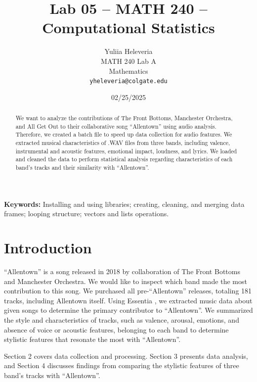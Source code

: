 \documentclass{article}\usepackage[]{graphicx}\usepackage[]{xcolor}
\begin{document}
\vspace{-1in}
\title{Lab 05 -- MATH 240 -- Computational Statistics}

\author{
  Yuliia Heleveria \\
  MATH 240 Lab A  \\
  Mathematics  \\
  {\tt yheleveria@colgate.edu}
}

\date{02/25/2025}

\maketitle

\begin{multicols}{2}
\begin{abstract}
We want to analyze the contributions of The Front Bottoms, Manchester Orchestra, and All Get Out to their collaborative song ``Allentown'' using audio analysis. Therefore, we created a batch file to speed up data collection for audio features. We extracted musical characteristics of .WAV files from three bands, including valence, instrumental and acoustic features, emotional impact, loudness, and lyrics. We loaded and cleaned the data to perform statistical analysis regarding characteristics of each band's tracks and their similarity with ``Allentown''. 
\end{abstract}

\noindent \textbf{Keywords:} Installing and using libraries; creating, cleaning, and merging data frames; looping structure; vectors and lists operations.

\section{Introduction}
``Allentown'' is a song released in 2018 by collaboration of The Front Bottoms and Manchester Orchestra. We would like to inspect which band made the most contribution to this song. We purchased all pre-``Allentown'' releases, totaling 181 tracks, including Allentown itself.
Using Essentia \citep{bogdanov2013essentia}, we extracted music data about given songs to determine the primary contributor to ``Allentown''. We summarized the style and characteristics of tracks, such as valence, arousal, emotions, and absence of voice or acoustic features, belonging to each band to determine stylistic features that resonate the most with ``Allentown''. 

Section 2 covers data collection and processing. Section 3 presents data analysis, and Section 4 discusses findings from comparing the stylistic features of three band's tracks with ``Allentown''.


\end{multicols}
\end{document}

